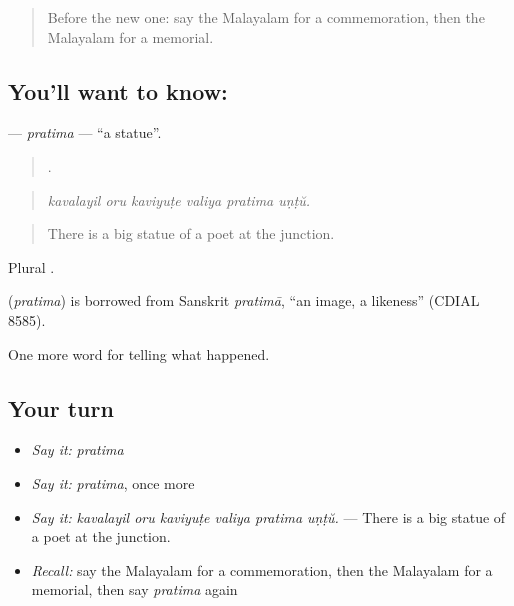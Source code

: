 \label{lesson:ML-C393-pratima}



\begin{quote}
Before the new one: say the Malayalam for a commemoration, then the Malayalam for a memorial.
\end{quote}

\subsection*{You'll want to know: }
\textbf{} — \emph{pratima} — \textquotedblleft{}a statue\textquotedblright{}.

\begin{quote}
     .
\end{quote}

\begin{quote}
\emph{kavalayil oru kaviyuṭe valiya pratima uṇṭŭ.}
\end{quote}

\begin{quote}
There is a big statue of a poet at the junction.
\end{quote}

Plural .

\begin{cousinweb}
\textbf{} (\emph{pratima}) is borrowed from Sanskrit \emph{pratimā}, \textquotedblleft{}an image, a likeness\textquotedblright{} (CDIAL 8585).
\end{cousinweb}

\begin{grammarlens}[title={What you've built}]
One more word for telling what happened.
\end{grammarlens}

\subsection*{Your turn}
\begin{itemize}
\raggedright
  \item \emph{Say it:} \emph{pratima}
  \item \emph{Say it:} \emph{pratima}, once more
  \item \emph{Say it:} \emph{kavalayil oru kaviyuṭe valiya pratima uṇṭŭ.} — There is a big statue of a poet at the junction.
  \item \emph{Recall:} say the Malayalam for a commemoration, then the Malayalam for a memorial, then say \emph{pratima} again
\end{itemize}

